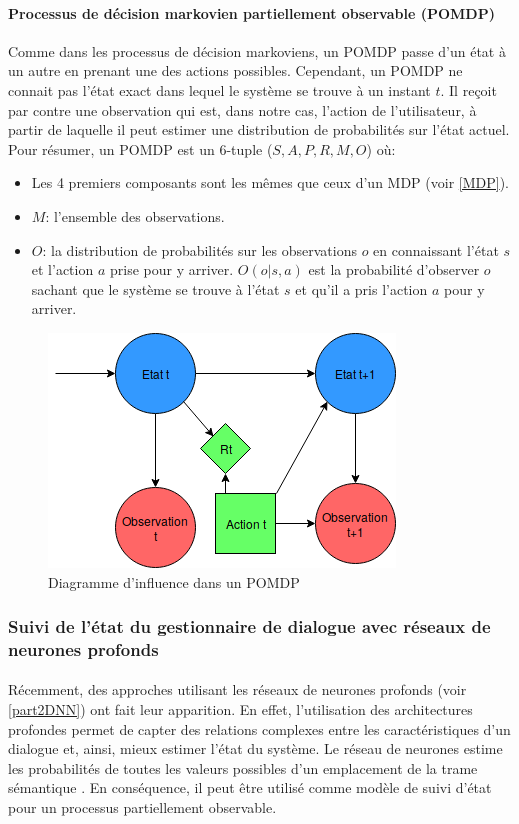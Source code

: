 \paragraph{Processus de décision markovien partiellement observable (POMDP)}
Comme dans les processus de décision markoviens, un POMDP \citep{Astrom1965} passe d'un état à un autre en prenant une des actions possibles. Cependant, un POMDP ne connait pas l'état exact dans lequel le système se trouve à un instant $t$. Il reçoit par contre une observation qui est, dans notre cas, l'action de l'utilisateur, à partir de laquelle il peut estimer une distribution de probabilités sur l'état actuel. Pour résumer, un POMDP est un 6-tuple ($S,A,P,R,M,O$) où:
\begin{itemize}
	\item Les 4 premiers composants sont les mêmes que ceux d'un MDP (voir \ref{MDP}).
	\item $M$: l'ensemble des observations.
	\item $O$: la distribution de probabilités sur les observations $o$ en connaissant l'état $s$ et l'action $a$ prise pour y arriver. $O(o|s,a)$ est la probabilité d'observer $o$ sachant que le système se trouve à l'état $s$ et qu'il a pris l'action $a$ pour y arriver.
\end{itemize}

\begin{figure}[H]
	\centering
	\includegraphics[width=.5\linewidth]{images/DM/POMDP.png} 
	\caption{Diagramme d'influence dans un POMDP} 
\end{figure}

\subsubsection{Suivi de l'état du gestionnaire de dialogue avec réseaux de neurones profonds}
\paragraph{}
Récemment, des approches utilisant les réseaux de neurones profonds (voir \ref{part2DNN}) ont fait leur apparition. En effet, l'utilisation des architectures profondes permet de capter des relations complexes entre les caractéristiques d'un dialogue et, ainsi, mieux estimer l'état du système. Le réseau de neurones estime les probabilités de toutes les valeurs possibles d'un emplacement de la trame sémantique \citep{Henderson2013}. En conséquence, il peut être utilisé comme modèle de suivi d'état pour un processus partiellement observable.

